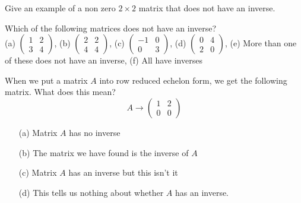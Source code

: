 \begin{problem}
    Give an example of a non zero $2 \times 2$ matrix that does not have an inverse.
\end{problem}
\solution{
    \[ A = \begin{pmatrix} 1 & 0 \\ 0 & 0 \end{pmatrix} \]
}

\begin{problem}
    Which of the following matrices does not have an inverse?\\
        (a) $\begin{pmatrix} 1 & 2 \\ 3 & 4 \end{pmatrix}$, \quad (b)
        $\begin{pmatrix} 2 & 2 \\ 4 & 4 \end{pmatrix}$, \quad (c)
        $\begin{pmatrix} -1 & 0 \\ 0 & 3 \end{pmatrix}$, \quad (d)
        $\begin{pmatrix} 0 & 4 \\ 2 & 0 \end{pmatrix}$, \quad (e)
        More than one of these does not have an inverse, \quad (f)
        All have inverses
\end{problem}

%             

\begin{problem}
    When we put a matrix $A$ into row reduced echelon form, we get the following matrix.
    What does this mean?
    \[ A \to \begin{pmatrix} 1 & 2 \\ 0 & 0 \end{pmatrix} \]
    \begin{enumerate}
        \item[(a)] Matrix $A$ has no inverse
        \item[(b)] The matrix we have found is the inverse of $A$
        \item[(c)] Matrix $A$ has an inverse but this isn't it
        \item[(d)] This tells us nothing about whether $A$ has an inverse.
    \end{enumerate}
\end{problem}

